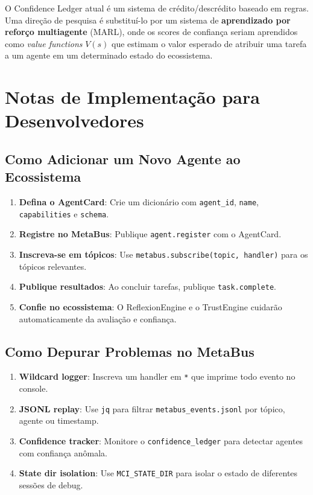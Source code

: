 O Confidence Ledger atual é um sistema de crédito/descrédito baseado em regras. Uma direção de pesquisa é substituí-lo por um sistema de \textbf{aprendizado por reforço multiagente} (MARL), onde os scores de confiança seriam aprendidos como \textit{value functions} $V(s)$ que estimam o valor esperado de atribuir uma tarefa a um agente em um determinado estado do ecossistema.

\section{Notas de Implementação para Desenvolvedores}
\label{sec:dev-notes}

\subsection{Como Adicionar um Novo Agente ao Ecossistema}

\begin{enumerate}
    \item \textbf{Defina o AgentCard}: Crie um dicionário com \texttt{agent\_id}, \texttt{name}, \texttt{capabilities} e \texttt{schema}.
    \item \textbf{Registre no MetaBus}: Publique \texttt{agent.register} com o AgentCard.
    \item \textbf{Inscreva-se em tópicos}: Use \texttt{metabus.subscribe(topic, handler)} para os tópicos relevantes.
    \item \textbf{Publique resultados}: Ao concluir tarefas, publique \texttt{task.complete}.
    \item \textbf{Confie no ecossistema}: O ReflexionEngine e o TrustEngine cuidarão automaticamente da avaliação e confiança.
\end{enumerate}

\subsection{Como Depurar Problemas no MetaBus}

\begin{enumerate}
    \item \textbf{Wildcard logger}: Inscreva um handler em \texttt{*} que imprime todo evento no console.
    \item \textbf{JSONL replay}: Use \texttt{jq} para filtrar \texttt{metabus\_events.jsonl} por tópico, agente ou timestamp.
    \item \textbf{Confidence tracker}: Monitore o \texttt{confidence\_ledger} para detectar agentes com confiança anômala.
    \item \textbf{State dir isolation}: Use \texttt{MCI\_STATE\_DIR} para isolar o estado de diferentes sessões de debug.
\end{enumerate}

